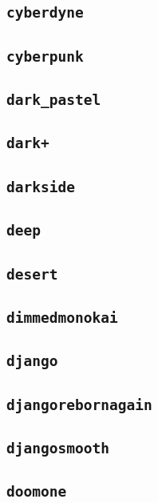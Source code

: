 \subsection{\texttt{cyberdyne}}
\newpage
\subsection{\texttt{cyberpunk}}
\newpage
\subsection{\texttt{dark\_pastel}}
\newpage
\subsection{\texttt{dark+}}
\newpage
\subsection{\texttt{darkside}}
\newpage
\subsection{\texttt{deep}}
\newpage
\subsection{\texttt{desert}}
\newpage
\subsection{\texttt{dimmedmonokai}}
\newpage
\subsection{\texttt{django}}
\newpage
\subsection{\texttt{djangorebornagain}}
\newpage
\subsection{\texttt{djangosmooth}}
\newpage
\subsection{\texttt{doomone}}
\newpage
